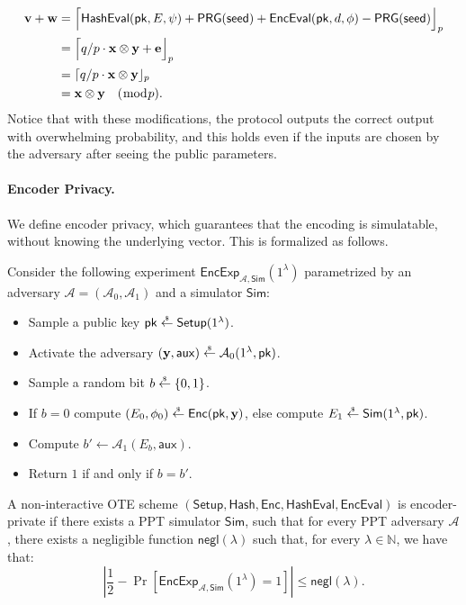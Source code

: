 \documentclass{article}
\newcommand{\getsr}{\overset{\raisebox{-1pt}{$\scriptscriptstyle \$$}}{\gets}}
\newcommand{\sample}{\getsr}
\newcommand{\N}{\mathbb{N}}
\newcommand{\negl}{\mathsf{negl}}
\renewcommand{\sec}{\ensuremath{\lambda}}
\newcommand{\aux}{\mathsf{aux}}
\newcommand{\Sim}{\mathsf{Sim}}
\newcommand{\Adv}{\mathcal{A}}
\newcommand{\algofont}[1]{\ensuremath{\mathsf{#1}}}
\newcommand{\Enc}{{\algofont{Enc}}}
\newcommand{\Setup}{{\algofont{Setup}}}
\newcommand{\Eval}{\algofont{Eval}\xspace}
\newcommand{\Hash}{{\algofont{Hash}}}
\newcommand{\pk}{{\mathsf{pk}}}
\newcommand\bbbone{1}
\begin{document}
{\begin{align*}
\mathbf{v}+\mathbf{w}&=\Bigl\lceil\Hash\Eval(\pk, E, \psi)+\mathsf{PRG}(\mathsf{seed})+\Enc\Eval(\pk, d, \phi)-\mathsf{PRG}(\mathsf{seed})\Bigr\rfloor_p\\
&=\Bigl\lceil q/p \cdot \mathbf{x} \otimes \mathbf{y}+\mathbf{e}\Bigr\rfloor_p\\
&= \lceil q/p \cdot \mathbf{x} \otimes \mathbf{y}\rfloor_p\\
&=  \mathbf{x} \otimes \mathbf{y} \quad(\bmod p).
\end{align*}
Notice that with these modifications, the protocol outputs the correct output with overwhelming probability, and this holds even if the inputs are chosen by the adversary after seeing the public parameters.}

\paragraph{Encoder Privacy.} We define encoder privacy, which guarantees that the encoding is simulatable, without knowing the underlying vector. This is formalized as follows.

\begin{definition}
Consider the following experiment $\mathsf{EncExp}_{\mathcal{A}, \Sim}(\bbbone^\sec)$ parametrized by an adversary $\mathcal{A} = (\mathcal{A}_0, \allowbreak \mathcal{A}_1)$ and a simulator $\Sim$:
\begin{itemize}
    \item Sample a public key $\pk\sample\Setup(\bbbone^\sec)$.
    \item Activate the adversary $(\mathbf{y}, \aux)\sample\Adv_0(\bbbone^\sec, \pk)$.
    \item Sample a random bit $b\sample\{0, 1\}$. 
    \item If $b = 0$ compute $(E_0, \phi_0)\sample\Enc(\pk, \mathbf{y})$, else compute 
    $E_1\sample\Sim(\bbbone^\sec, \pk)$.
    \item Compute $b' \gets \Adv_1(E_b, \aux)$.
    \item Return $1$ if and only if $b =b'$.
\end{itemize}
A non-interactive OTE scheme $(\Setup, \allowbreak \Hash, \allowbreak \Enc, \allowbreak \Hash\Eval, \allowbreak \Enc\Eval)$ is encoder-private if there exists a PPT simulator $\Sim$, such that for every PPT adversary $\mathcal{A}$, there exists a negligible function $\negl(\sec)$ such that, for every $\sec\in\N$, we have that:
\[
\left|\frac{1}{2} - \Pr\left[\mathsf{EncExp}_{\mathcal{A}, \Sim}(\bbbone^\sec) = 1\right] \right|\le\negl(\sec).
\]
\end{definition}
\end{document}
